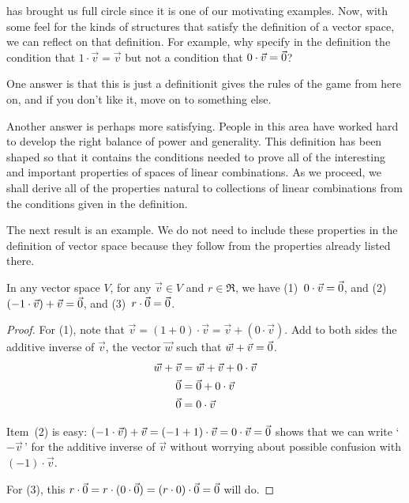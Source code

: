  has brought us full circle since it is one of
our motivating examples.
Now, with some feel for the kinds of structures that satisfy the definition
of a vector space, we can reflect on that definition.
For example, why specify in the definition the condition that 
\( 1\cdot\vec{v}=\vec{v} \) but not a condition that \( 0\cdot\vec{v}=\vec{0} \)?

One answer is that this is just a definition\Dash it gives the rules of the
game from here on, and if you don't like it, move on to something else.

Another answer is perhaps more satisfying.
People in this area have worked hard to develop the
right balance of power and generality.
This definition has been shaped so that it contains the conditions
needed to prove all of the interesting and
important properties of spaces of linear combinations.
As we proceed, we shall derive all of the properties natural to collections of
linear combinations from the conditions given in the definition.

The next result is an example.
We do not need to include these properties in the definition of vector space
because they follow from the properties already listed there.

\begin{lemma}
In any vector space \( V \), 
for any \( \vec{v}\in V \) and \( r\in\Re \), we have
(1)~\( 0\cdot\vec{v}=\vec{0} \), and
(2)~\( (-1\cdot\vec{v})+\vec{v}=\vec{0} \), and 
(3)~\( r\cdot\vec{0}=\vec{0} \).
\end{lemma}

\begin{proof}
For (1), note that 
\( \vec{v}=(1+0)\cdot\vec{v}=\vec{v}+(0\cdot\vec{v}) \).
Add to both sides the additive inverse of \( \vec{v} \),
the vector \( \vec{w} \) such that \( \vec{w}+\vec{v}=\vec{0} \).
\begin{align*}
  \vec{w}+\vec{v}
  &=\vec{w}+\vec{v}+0\cdot\vec{v}  \\
  \vec{0}
  &=\vec{0}+0\cdot\vec{v}                   \\
  \vec{0}
  &=0\cdot\vec{v}
\end{align*}

Item~(2) is easy:
\(  (-1\cdot\vec{v})+\vec{v}=(-1+1)\cdot\vec{v}=0\cdot\vec{v}=\vec{0} \)
shows that we can write `\( -\vec{v}\, \)' for the additive inverse
of \( \vec{v} \) without worrying about possible confusion with
\( (-1)\cdot\vec{v} \).

For (3), this
\( r\cdot\vec{0}
  =
  r\cdot(0\cdot\vec{0})
  =
  (r\cdot 0)\cdot\vec{0}
  =
  \vec{0} \)
will do.
\end{proof}

